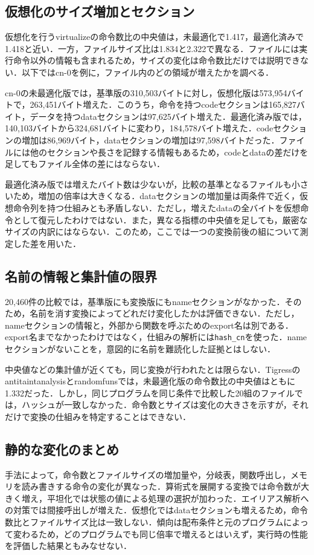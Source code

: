 \documentclass[submit,techrep]{ipsj}
\begin{document}
\subsection{仮想化のサイズ増加とセクション}
仮想化を行うvirtualizeの命令数比の中央値は，未最適化で1.417，最適化済みで1.418と近い．一方，ファイルサイズ比は1.834と2.322で異なる．ファイルには実行命令以外の情報も含まれるため，サイズの変化は命令数比だけでは説明できない．以下ではcn-0を例に，ファイル内のどの領域が増えたかを調べる．

cn-0の未最適化版では，基準版の310,503バイトに対し，仮想化版は573,954バイトで，263,451バイト増えた．このうち，命令を持つcodeセクションは165,827バイト，データを持つdataセクションは97,625バイト増えた．最適化済み版では，140,103バイトから324,681バイトに変わり，184,578バイト増えた．codeセクションの増加は86,969バイト，dataセクションの増加は97,598バイトだった．ファイルには他のセクションや長さを記録する情報もあるため，codeとdataの差だけを足してもファイル全体の差にはならない．

最適化済み版では増えたバイト数は少ないが，比較の基準となるファイルも小さいため，増加の倍率は大きくなる．dataセクションの増加量は両条件で近く，仮想命令列を持つ仕組みとも矛盾しない．ただし，増えたdataの全バイトを仮想命令として復元したわけではない．また，異なる指標の中央値を足しても，厳密なサイズの内訳にはならない．このため，ここでは一つの変換前後の組について測定した差を用いた．

\subsection{名前の情報と集計値の限界}
20,460件の比較では，基準版にも変換版にもnameセクションがなかった．そのため，名前を消す変換によってどれだけ変化したかは評価できない．ただし，nameセクションの情報と，外部から関数を呼ぶためのexport名は別である．export名までなかったわけではなく，仕組みの解析には\texttt{hash\_cn}を使った．nameセクションがないことを，意図的に名前を難読化した証拠とはしない．

中央値などの集計値が近くても，同じ変換が行われたとは限らない．Tigressのantitaintanalysisとrandomfunsでは，未最適化版の命令数比の中央値はともに1.332だった．しかし，同じプログラムを同じ条件で比較した20組のファイルでは，ハッシュが一致しなかった．命令数とサイズは変化の大きさを示すが，それだけで変換の仕組みを特定することはできない．

\subsection{静的な変化のまとめ}
手法によって，命令数とファイルサイズの増加量や，分岐表，関数呼出し，メモリを読み書きする命令の変化が異なった．算術式を展開する変換では命令数が大きく増え，平坦化では状態の値による処理の選択が加わった．エイリアス解析への対策では間接呼出しが増えた．仮想化ではdataセクションも増えるため，命令数比とファイルサイズ比は一致しない．傾向は配布条件と元のプログラムによって変わるため，どのプログラムでも同じ倍率で増えるとはいえず，実行時の性能を評価した結果ともみなせない．
\end{document}
